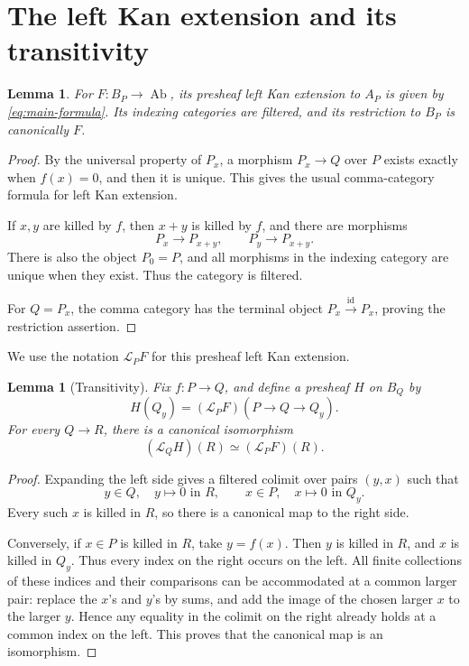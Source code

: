 \documentclass[11pt]{article}
\newtheorem{lemma}[theorem]{Lemma}
\theoremstyle{definition}
\theoremstyle{remark}
\DeclareMathOperator{\Ab}{Ab}
\newcommand{\LL}{\mathcal L}
\begin{document}
\section{The left Kan extension and its transitivity}

\begin{lemma}\label{lem:kan}
For \(F:B_P\to\Ab\), its presheaf left Kan extension to \(A_P\) is
given by \eqref{eq:main-formula}. Its indexing categories are
filtered, and its restriction to \(B_P\) is canonically \(F\).
\end{lemma}

\begin{proof}
By the universal property of \(P_x\), a morphism \(P_x\to Q\) over
\(P\) exists exactly when \(f(x)=0\), and then it is unique.
This gives the usual comma-category formula for left Kan
extension.

If \(x,y\) are killed by \(f\), then \(x+y\) is killed by \(f\), and
there are morphisms
\[
P_x\longrightarrow P_{x+y},
\qquad
P_y\longrightarrow P_{x+y}.
\]
There is also the object \(P_0=P\), and all morphisms in the
indexing category are unique when they exist. Thus the category
is filtered.

For \(Q=P_x\), the comma category has the terminal object
\(P_x\xrightarrow{\mathrm{id}}P_x\), proving the restriction
assertion.
\end{proof}

We use the notation \(\LL_PF\) for this presheaf left Kan extension.

\begin{lemma}[Transitivity]\label{lem:transitivity}
Fix \(f:P\to Q\), and define a presheaf \(H\) on \(B_Q\) by
\[
H(Q_y)=(\LL_PF)(P\to Q\to Q_y).
\]
For every \(Q\to R\), there is a canonical isomorphism
\[
(\LL_QH)(R)\simeq(\LL_PF)(R).
\]
\end{lemma}

\begin{proof}
Expanding the left side gives a filtered colimit over pairs
\((y,x)\) such that
\[
y\in Q,\quad y\mapsto0\text{ in }R,
\qquad
x\in P,\quad x\mapsto0\text{ in }Q_y.
\]
Every such \(x\) is killed in \(R\), so there is a canonical map to
the right side.

Conversely, if \(x\in P\) is killed in \(R\), take \(y=f(x)\).
Then \(y\) is killed in \(R\), and \(x\) is killed in \(Q_y\).
Thus every index on the right occurs on the left.
All finite collections of these indices and their comparisons can
be accommodated at a common larger pair: replace the \(x\)'s and
\(y\)'s by sums, and add the image of the chosen larger \(x\) to
the larger \(y\). Hence any equality in the colimit on the right
already holds at a common index on the left. This proves that the
canonical map is an isomorphism.
\end{proof}
\end{document}
